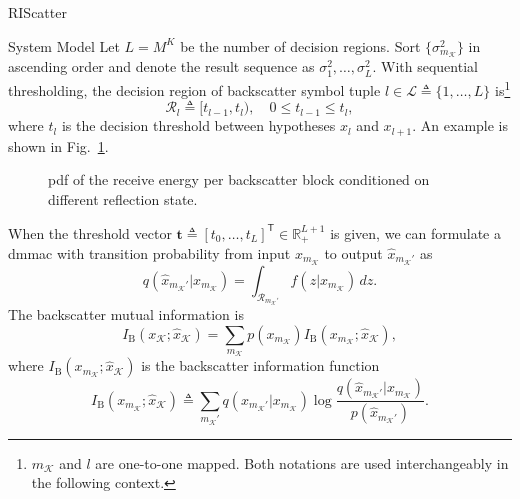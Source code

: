 \begin{section}{RIScatter}
\begin{subsection}{System Model}
		Let $L = M^K$ be the number of decision regions.
		Sort $\{\sigma_{m_{\mathcal{K}}}^2\}$ in ascending order and denote the result sequence as $\sigma_1^2,\ldots,\sigma_L^2$.
		With sequential thresholding, the decision region of backscatter symbol tuple $l \in \mathcal{L} \triangleq \{1,\ldots,L\}$ is\footnote{$m_{\mathcal{K}}$ and $l$ are one-to-one mapped. Both notations are used interchangeably in the following context.}
		\begin{equation}
			\mathcal{R}_{l} \triangleq [t_{l-1},t_l), \quad 0 \le t_{l-1} \le t_l,
		\end{equation}
		where $t_l$ is the decision threshold between hypotheses $x_{l}$ and $x_{l+1}$.
		An example is shown in Fig.~\ref{fg:energy_distribution}.

		\begin{figure}[H]
			\centering
			\resizebox{0.8\columnwidth}{!}{
				
			}
			\caption{
				\gls{pdf} of the receive energy per backscatter block conditioned on different reflection state.
			}
			\label{fg:energy_distribution}
		\end{figure}

		When the threshold vector $\mathbf{t} \triangleq [t_0,\ldots,t_L]^\mathsf{T} \in \mathbb{R}_+^{L+1}$ is given, we can formulate a \gls{dmmac} with transition probability from input $x_{m_{\mathcal{K}}}$ to output $\hat{x}_{m_{\mathcal{K}}'}$ as
		\begin{equation}
			q(\hat{x}_{m_{\mathcal{K}}'}|x_{m_{\mathcal{K}}}) = \int_{\mathcal{R}_{m_{\mathcal{K}}'}} f(z|x_{m_{\mathcal{K}}}) \, d z.
			\label{eq:dmmac}
		\end{equation}
		The backscatter mutual information is
		\begin{equation}
			I_{\text{B}}(x_{\mathcal{K}};\hat{x}_{\mathcal{K}}) = \sum_{m_{\mathcal{K}}} p(x_{m_{\mathcal{K}}}) I_{\text{B}}(x_{m_{\mathcal{K}}};\hat{x}_{\mathcal{K}}),
			\label{eq:backscatter_mutual_information}
		\end{equation}
		where $I_{\text{B}}(x_{m_{\mathcal{K}}};\hat{x}_{\mathcal{K}})$ is the backscatter information function
		\begin{equation}
			I_{\text{B}}(x_{m_{\mathcal{K}}};\hat{x}_{\mathcal{K}}) \triangleq \sum_{m_{\mathcal{K}}'} q(\hat{x}_{m_{\mathcal{K}}'}|x_{m_{\mathcal{K}}}) \log \frac{q(\hat{x}_{m_{\mathcal{K}}'}|x_{m_{\mathcal{K}}})}{p(\hat{x}_{m_{\mathcal{K}}'})}.
			\label{eq:backscatter_information_function}
		\end{equation}


\end{subsection}
\end{section}
